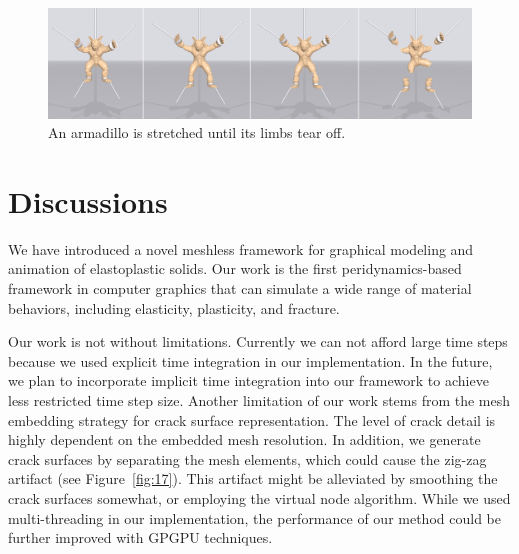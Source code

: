 \begin{figure}[t]
  \centering
  \includegraphics[width=\linewidth]{../figs/demo_tear_armadillo.png}
  \caption{\label{fig:13}
  An armadillo is stretched until its limbs tear off.
}
\end{figure}

\section{Discussions}
We have introduced a novel meshless framework for graphical modeling and animation of elastoplastic solids. Our work is the first peridynamics-based framework in computer graphics that can simulate a wide range of material behaviors, including elasticity, plasticity, and fracture.

Our work is not without limitations. Currently we can not afford large time steps because we used explicit time integration in our implementation. In the future, we plan to incorporate implicit time integration into our framework to achieve less restricted time step size. Another limitation of our work stems from the mesh embedding strategy for crack surface representation. The level of crack detail is highly dependent on the embedded mesh resolution. In addition, we generate crack surfaces by separating the mesh elements, which could cause the zig-zag artifact (see Figure~\ref{fig:17}). This artifact might be alleviated by smoothing the crack surfaces somewhat, or employing the virtual node algorithm. While we used multi-threading in our implementation, the performance of our method could be further improved with GPGPU techniques.

